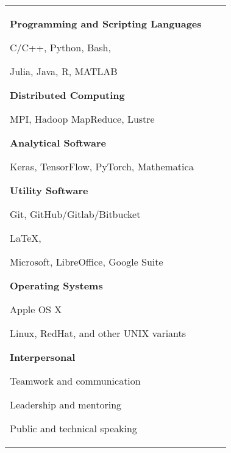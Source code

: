 \begin{tabular}[t]{@{}p{\textwidth-\rcollength-3.5\spacewidth}@{}p{\spacewidth}@{}p{\rcollength}}
\parbox{\textwidth-\rcollength-\spacewidth}{%
\textbf{Programming and Scripting Languages}
\begin{innerlist}
	\item[] C/C++, Python, Bash, 
	\item[] Julia, Java, R, MATLAB
\end{innerlist}
\textbf{Distributed Computing}
\begin{innerlist}
	\item[] MPI, Hadoop MapReduce, Lustre
\end{innerlist}
%
\textbf{Analytical Software}
\begin{innerlist}
	\item[] Keras, TensorFlow, PyTorch, Mathematica
\end{innerlist}
%
\textbf{Utility Software}
\begin{innerlist}
	\item[] Git, GitHub/Gitlab/Bitbucket
	\item[] \LaTeX{}, \BibTeX
	\item[] Microsoft, LibreOffice, Google Suite 
\end{innerlist}
%
\textbf{Operating Systems}
\begin{innerlist}
    \item[] Apple OS X
    \item[] Linux, RedHat, and other UNIX variants
\end{innerlist}
%
\textbf{Interpersonal}
\begin{innerlist}
	\item[] Teamwork and communication
	\item[] Leadership and mentoring
	\item[] Public and technical speaking
\end{innerlist}
}


\end{tabular}